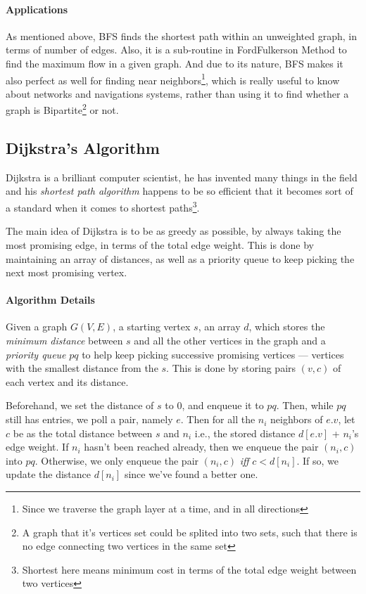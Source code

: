 \documentclass[12pt]{article}
\begin{document}
\paragraph{Applications} As mentioned above, BFS finds the shortest path within  an unweighted graph, in terms of number of edges. Also, it is a sub-routine in FordFulkerson Method to find the maximum flow in a given graph. And due to its nature, BFS makes it also perfect as well for finding near neighbors\footnote{Since we traverse the graph layer at a time, and in all directions}, which is really useful to know about networks and navigations systems, rather than using it to find whether a graph is Bipartite\footnote{A graph that it's vertices set could be splited into two sets, such that there is no edge connecting two vertices in the same set} or not.

\subsection{Dijkstra's Algorithm}

Dijkstra is a brilliant computer scientist, he has invented many things in the field and his \textit{shortest path algorithm} happens to be so efficient that it becomes sort of a standard when it comes to shortest paths\footnote{Shortest here means minimum cost in terms of the total edge weight between two vertices}.

The main idea of Dijkstra is to be as greedy as possible, by always taking the most promising edge, in terms of the total edge weight. This is done by maintaining an array of distances, as well as a priority queue to keep picking the next most promising vertex.

\paragraph{Algorithm Details} Given a graph $G(V,E)$, a starting vertex $s$, an array $d$, which stores the \textit{minimum distance} between $s$ and all the other vertices in the graph and a \textit{priority queue} $pq$ to help keep picking successive promising vertices ---  vertices with the smallest distance from the $s$. This is done by storing pairs $(v,c)$ of each vertex and its distance.

Beforehand, we set the distance of $s$ to $0$, and enqueue it to $pq$. Then, while $pq$ still has entries, we poll a pair, namely $e$. Then for all the $n_i$ neighbors of $e.v$, let $c$ be as the total distance between $s$ and $n_i$ i.e., the stored distance $d[e.v]$ + $n_i$'s edge weight. If $n_i$ hasn't been reached already, then we enqueue the pair $(n_i,c)$ into $pq$. Otherwise, we only enqueue the pair $(n_i,c)$ \textit{iff} $c < d[n_i]$. If so, we update the distance $d[n_i]$ since we've found a better one.
\end{document}
